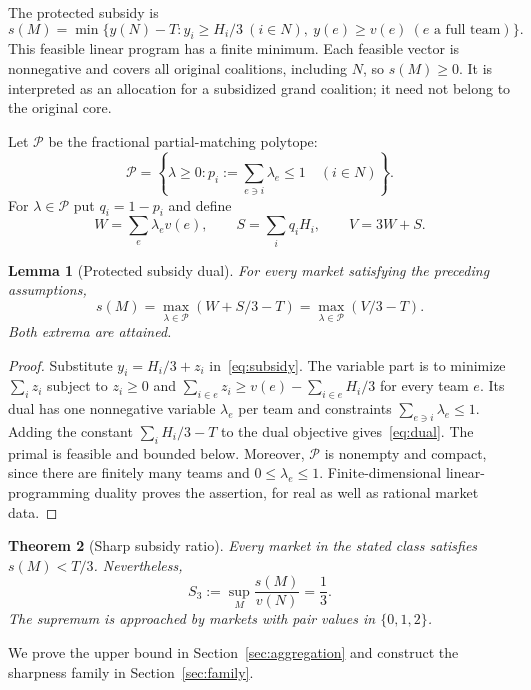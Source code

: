 \documentclass[11pt]{article}
\newtheorem{theorem}{Theorem}[section]
\newtheorem{lemma}[theorem]{Lemma}
\theoremstyle{remark}
\newcommand{\pack}{\mathcal P}
\begin{document}
The protected subsidy is
\begin{equation}\label{eq:subsidy}
 s(M)=\min\{y(N)-T:y_i\ge H_i/3\ (i\in N),\
                         y(e)\ge v(e)\ (e\text{ a full team})\}.
\end{equation}
This feasible linear program has a finite minimum. Each feasible vector
is nonnegative and covers all original coalitions, including $N$, so
$s(M)\ge0$. It is interpreted as an allocation for a subsidized grand
coalition; it need not belong to the original core.

Let $\pack$ be the fractional partial-matching polytope:
\[
 \pack=\left\{\lambda\ge0:
               p_i:=\sum_{e\ni i}\lambda_e\le1\quad(i\in N)\right\}.
\]
For $\lambda\in\pack$ put $q_i=1-p_i$ and define
\begin{equation}\label{eq:dualquantities}
 W=\sum_e\lambda_e v(e),\qquad
 S=\sum_iq_iH_i,\qquad V=3W+S.
\end{equation}

\begin{lemma}[Protected subsidy dual]\label{lem:dual}
For every market satisfying the preceding assumptions,
\begin{equation}\label{eq:dual}
                  s(M)=\max_{\lambda\in\pack}(W+S/3-T)
                       =\max_{\lambda\in\pack}(V/3-T).
\end{equation}
Both extrema are attained.
\end{lemma}
\begin{proof}
Substitute $y_i=H_i/3+z_i$ in~\eqref{eq:subsidy}. The variable part is
to minimize $\sum_i z_i$ subject to $z_i\ge0$ and
$\sum_{i\in e}z_i\ge v(e)-\sum_{i\in e}H_i/3$ for every team $e$.
Its dual has one nonnegative variable $\lambda_e$ per team and constraints
$\sum_{e\ni i}\lambda_e\le1$. Adding the constant
$\sum_iH_i/3-T$ to the dual objective gives~\eqref{eq:dual}.
The primal is feasible and bounded below. Moreover, $\pack$ is nonempty
and compact, since there are finitely many teams and $0\le\lambda_e\le1$.
Finite-dimensional linear-programming duality proves the assertion, for
real as well as rational market data.
\end{proof}

\begin{theorem}[Sharp subsidy ratio]\label{thm:main}
Every market in the stated class satisfies $s(M)<T/3$. Nevertheless,
\begin{equation}\label{eq:sharp}
             S_3:=\sup_M\frac{s(M)}{v(N)}=\frac13.
\end{equation}
The supremum is approached by markets with pair values in $\{0,1,2\}$.
\end{theorem}
We prove the upper bound in Section~\ref{sec:aggregation} and construct the
sharpness family in Section~\ref{sec:family}.
\end{document}

